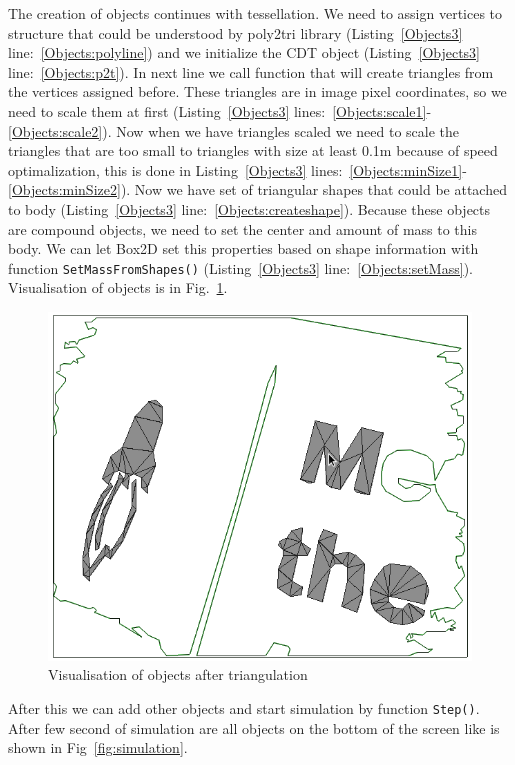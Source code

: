 \documentclass{ifacconf}
\begin{document}
The creation of objects continues with tessellation. We need to assign vertices
to structure that could be understood by poly2tri library
(Listing~\ref{Objects3} line:~\ref{Objects:polyline}) and we initialize the CDT
object (Listing~\ref{Objects3} line:~\ref{Objects:p2t}). In next line we call
function that will create triangles from the vertices assigned before. These
triangles are in image pixel coordinates, so we need to scale them at first
(Listing~\ref{Objects3} lines:~\ref{Objects:scale1}-\ref{Objects:scale2}). Now
when we have triangles scaled we need to scale the triangles that are too small
to triangles with size at least 0.1m because of speed optimalization, this is done in
Listing~\ref{Objects3} lines:~\ref{Objects:minSize1}-\ref{Objects:minSize2}).
Now we have set of triangular shapes that could be attached to body
(Listing~\ref{Objects3} line:~\ref{Objects:createshape}). Because these objects
are compound objects, we need to set the center and amount of mass to this 
body. We can let Box2D set this properties based on shape information with
function \lstinline{SetMassFromShapes()} (Listing~\ref{Objects3}
line:~\ref{Objects:setMass}). Visualisation of objects is in Fig.~\ref{fig:objects}.

\begin{figure}[h]
\includegraphics[width=\columnwidth]{images/6dynamic-objets.png}
\caption{Visualisation of objects after triangulation}
\label{fig:objects}
\end{figure}

After this we can add other objects and start simulation by function \lstinline{Step()}.
After few second of simulation are all objects on the bottom of the screen like
is shown in Fig~\ref{fig:simulation}.
\end{document}
